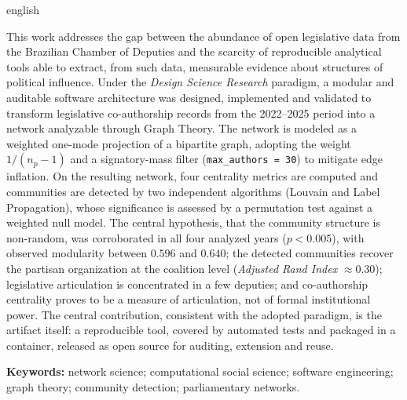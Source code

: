 \documentclass[
      12pt,
      a4paper,
      openright,
      oneside,
      chapter=TITLE,
      section=TITLE,
      english,
      french,
      spanish,
      brazilian
    ]{abntex2}
\begin{document}
    \begin{resumo}[Abstract]
    \begin{otherlanguage*}{english}

    This work addresses the gap between the abundance of open legislative data from the Brazilian Chamber of Deputies and the scarcity of reproducible analytical tools able to extract, from such data, measurable evidence about structures of political influence. Under the \textit{Design Science Research} paradigm, a modular and auditable software architecture was designed, implemented and validated to transform legislative co-authorship records from the 2022--2025 period into a network analyzable through Graph Theory. The network is modeled as a weighted one-mode projection of a bipartite graph, adopting the weight $1/(n_p-1)$ and a signatory-mass filter (\texttt{max\_authors = 30}) to mitigate edge inflation. On the resulting network, four centrality metrics are computed and communities are detected by two independent algorithms (Louvain and Label Propagation), whose significance is assessed by a permutation test against a weighted null model. The central hypothesis, that the community structure is non-random, was corroborated in all four analyzed years ($p<0.005$), with observed modularity between $0.596$ and $0.640$; the detected communities recover the partisan organization at the coalition level (\textit{Adjusted Rand Index} $\approx 0.30$); legislative articulation is concentrated in a few deputies; and co-authorship centrality proves to be a measure of articulation, not of formal institutional power. The central contribution, consistent with the adopted paradigm, is the artifact itself: a reproducible tool, covered by automated tests and packaged in a container, released as open source for auditing, extension and reuse.

        \vspace*{0.5cm}
        \noindent\textbf{{Keywords: }} network science; computational social science; software engineering; graph theory; community detection; parliamentary networks.
    \end{otherlanguage*}
    \end{resumo}
    
        \listoffigures*
        \newpage
    
\end{document}
